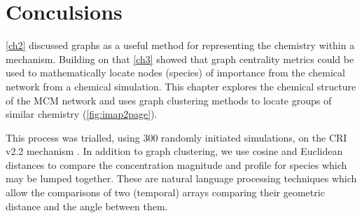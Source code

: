%
%
%
%
%
%
%
%
%
%
%
%
%
%
%
%
%
%
%
%
%
%
%
%
%
%
%
%
%





\newpage

\section{Conculsions}

\autoref{ch2} discussed graphs as a useful method for representing the chemistry within a mechanism. Building on that \autoref{ch3} showed that graph centrality metrics could be used to mathematically locate nodes (species) of importance from the chemical network from a chemical simulation. This chapter explores the chemical structure of the MCM network and uses graph clustering methods to locate groups of similar chemistry (\autoref{fig:imap2page}).

This process was trialled, using 300 randomly initiated simulations, on the CRI v2.2 mechanism \citep{cri}. In addition to graph clustering, we use cosine and Euclidean distances to compare the concentration magnitude and profile for species which may be lumped together. These are natural language processing techniques which allow the comparisons of two (temporal) arrays comparing their geometric distance and the angle between them.

